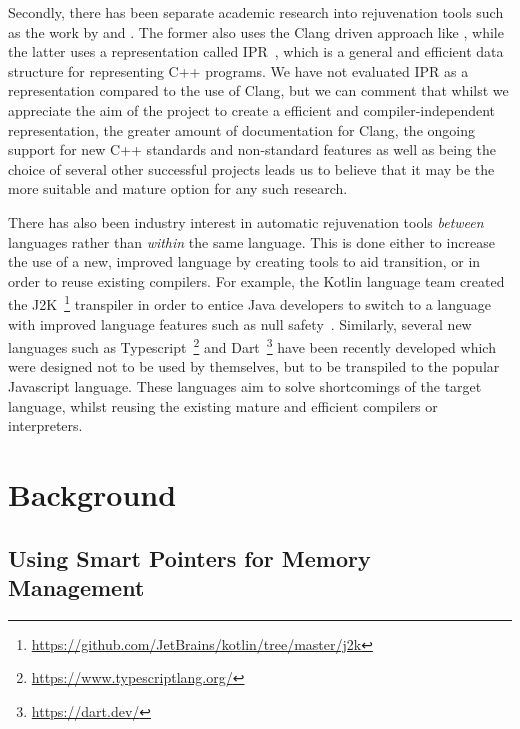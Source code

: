 \documentclass{mpaper}
\begin{document}
    Secondly, there has been separate academic research into rejuvenation tools such as the work by \citet{Huck2016} and \citet{Kumar2012}.
    The former also uses the Clang driven approach like \citet{Wright2013}, while the latter uses a representation called IPR~\cite{Dos2011}, which is a general and efficient data structure for representing C++ programs.
    We have not evaluated IPR as a representation compared to the use of Clang, but we can  comment that whilst we appreciate the aim of the project to create a efficient and compiler-independent representation, the greater amount of documentation for Clang, the ongoing support for new C++ standards and non-standard features as well as being the choice of several other successful projects leads us to believe that it may be the more suitable and mature option for any such research.
    
    There has also been industry interest in automatic rejuvenation tools \emph{between} languages rather than \emph{within} the same language. 
    This is done either to increase the use of a new, improved language by creating tools to aid transition, or in order to reuse existing compilers.
    For example, the Kotlin language team created the J2K~\footnote{\url{https://github.com/JetBrains/kotlin/tree/master/j2k}} transpiler in order to entice Java developers to switch to a language with improved language features such as null safety~\cite{Mateus2019}. 
    Similarly, several new languages such as Typescript~\footnote{\url{https://www.typescriptlang.org/}} and Dart~\footnote{\url{https://dart.dev/}} have been recently developed which were designed not to be used by themselves, but to be transpiled to the popular Javascript language.
    These languages aim to solve shortcomings of the target language, whilst reusing the existing mature and efficient compilers or interpreters.




    \section{Background}\label{sec:background}
    
    \subsection{Using Smart Pointers for Memory Management}\label{subsec:using-smart-pointers-for-memory-management}
\end{document}

